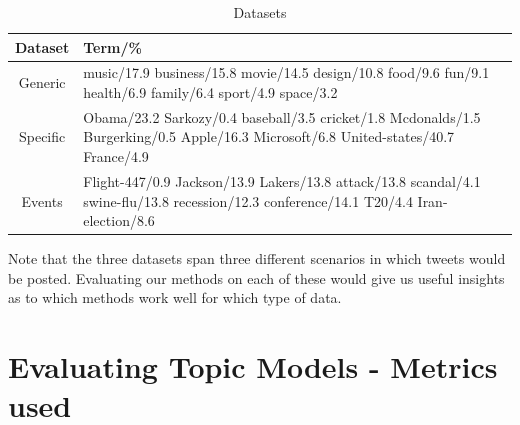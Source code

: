 \documentclass[10pt,a5paper,twoside]{article}
\begin{document}
\begin{table}[!h]
\centering
	\begin{tabular}{|c|p{4in}|}
	\hline
        Dataset & Term/\% \\
\hline
Generic &{\small music/17.9 business/15.8 movie/14.5 design/10.8
       food/9.6 fun/9.1 health/6.9 family/6.4 sport/4.9 space/3.2}  \\
Specific &{\small 
Obama/23.2 Sarkozy/0.4 baseball/3.5 cricket/1.8 Mcdonalds/1.5 Burgerking/0.5 Apple/16.3 Microsoft/6.8 United-states/40.7 France/4.9} \\
Events &{\small Flight-447/0.9 Jackson/13.9  Lakers/13.8 attack/13.8 scandal/4.1 swine-flu/13.8 recession/12.3 conference/14.1 T20/4.4 Iran-election/8.6  }\\
	\hline
	\end{tabular}
\caption{Datasets}\label{tbl-q}
\end{table}
Note that the three datasets span three different scenarios in which
tweets would be posted. Evaluating our methods on each of these would
give us useful insights as to which methods work well for which type
of data.
 


\section{Evaluating Topic Models - Metrics used}
\end{document}
